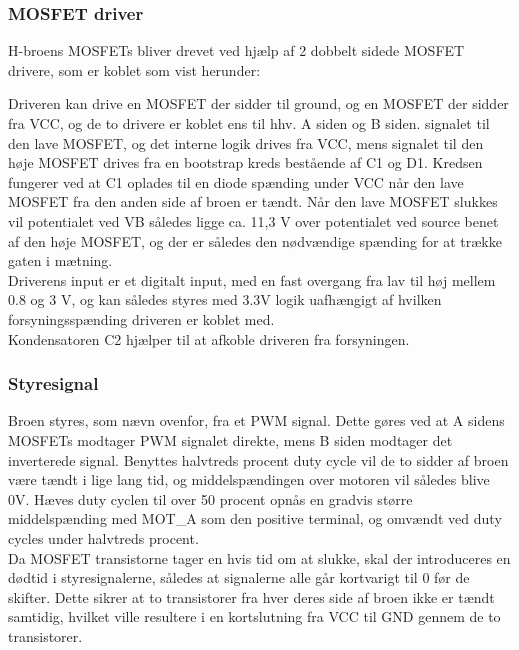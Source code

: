 \subsubsection*{MOSFET driver}
\label{Vuggesytem:HW_DESIGN_MOSDRIVER} 
H-broens MOSFETs bliver drevet ved hjælp af 2 dobbelt sidede MOSFET drivere, som er koblet som vist herunder:


Driveren kan drive en MOSFET der sidder til ground, og en MOSFET der sidder fra VCC, og de to drivere er koblet ens til hhv. A siden og B siden. signalet til den lave MOSFET, og det interne logik drives fra VCC, mens signalet til den høje MOSFET drives fra en bootstrap kreds bestående af C1 og D1. Kredsen fungerer ved at C1 oplades til en diode spænding under VCC når den lave MOSFET fra den anden side af broen er tændt. Når den lave MOSFET slukkes vil potentialet ved VB således ligge ca. 11,3 V over potentialet ved source benet af den høje MOSFET, og der er således den nødvændige spænding for at trække gaten i mætning. \\
Driverens input er et digitalt input, med en fast overgang fra lav til høj mellem 0.8 og 3 V, og kan således styres med 3.3V logik uafhængigt af hvilken forsyningsspænding driveren er koblet med. \\
Kondensatoren C2 hjælper til at afkoble driveren fra forsyningen. \\

\subsubsection*{Styresignal}
Broen styres, som nævn ovenfor, fra et PWM signal. Dette gøres ved at A sidens MOSFETs modtager PWM signalet direkte, mens B siden modtager det inverterede signal. Benyttes halvtreds procent duty cycle vil de to sidder af broen være tændt i lige lang tid, og middelspændingen over motoren vil således blive 0V. Hæves duty cyclen til over 50 procent opnås en gradvis større middelspænding med MOT\_A som den positive terminal, og omvændt ved duty cycles under halvtreds procent. \\
Da MOSFET transistorne tager en hvis tid om at slukke, skal der introduceres en dødtid i styresignalerne, således at signalerne alle går kortvarigt til 0 før de skifter. Dette sikrer at to transistorer fra hver deres side af broen ikke er tændt samtidig, hvilket ville resultere i en kortslutning fra VCC til GND gennem de to transistorer. 

